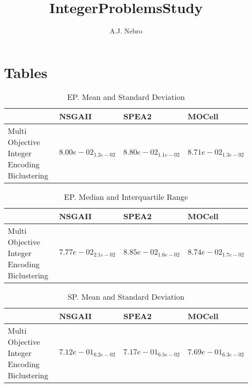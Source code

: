 \documentclass{article}
\title{IntegerProblemsStudy}
\author{A.J. Nebro}
\begin{document}
\maketitle
\section{Tables}

\begin{table}
\caption{EP. Mean and Standard Deviation}
\label{table: EP}
\centering
\begin{scriptsize}
\begin{tabular}{llll}
\hline & NSGAII & SPEA2 &  MOCell\\
\hline 
Multi Objective Integer Encoding Biclustering & \cellcolor{gray95}$  8.00e-02_{ 1.3e-02}$ & $  8.80e-02_{ 1.1e-02}$ & \cellcolor{gray25}$  8.71e-02_{ 1.3e-02}$ \\
\hline
\end{tabular}
\end{scriptsize}
\end{table}

\begin{table}
\caption{EP. Median and Interquartile Range}
\label{table: EP}
\centering
\begin{scriptsize}
\begin{tabular}{llll}
\hline & NSGAII & SPEA2 &  MOCell\\
\hline 
Multi Objective Integer Encoding Biclustering & \cellcolor{gray95}$  7.77e-02_{ 2.1e-02}$ & $  8.85e-02_{ 1.6e-02}$ & \cellcolor{gray25}$  8.74e-02_{ 1.7e-02}$ \\
\hline
\end{tabular}
\end{scriptsize}
\end{table}

\begin{table}
\caption{SP. Mean and Standard Deviation}
\label{table: SP}
\centering
\begin{scriptsize}
\begin{tabular}{llll}
\hline & NSGAII & SPEA2 &  MOCell\\
\hline 
Multi Objective Integer Encoding Biclustering & \cellcolor{gray95}$  7.12e-01_{ 6.2e-02}$ & \cellcolor{gray25}$  7.17e-01_{ 6.5e-02}$ & $  7.69e-01_{ 6.3e-02}$ \\
\hline
\end{tabular}
\end{scriptsize}
\end{table}
\end{document}
